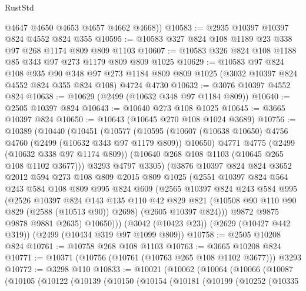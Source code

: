 \begin{lexlean}{RustStd}
\begin{coremodule}
        @4647
        @4650
        @4653
        @4657
        @4662
        @4668))
@10583 := @2935 @10397 @10397 @824 @4552 @824 @355
@10595 := @10583 @327 @824 @108 @1189 @23 @338 @97 @268 @1174 @809 @809 @1103
@10607 := @10583 @326 @824 @108 @1188 @85 @343 @97 @273 @1179 @809 @809 @1025
@10629 := @10583
    @97
    @824
    @108
    @935
    @90
    @348
    @97
    @273
    @1184
    @809
    @809
    @1025
    (@3032 @10397 @824 @4552 @824 @355 @824 @108)
    @4724
    @4730
@10632 := @3076 @10397 @4552 @824
@10638 := @10629 (@2499 (@10632 @348 @97 @1184 @809))
@10640 := @2505 @10397 @824
@10643 := @10640 @273 @108 @1025
@10645 := @3665 @10397 @824
@10650 := @10643 (@10645 @270 @108 @1024 @3689)
@10756 := @10389
    (@10440
      (@10451
        (@10577
          (@10595
            (@10607 (@10638 @10650) @4756 @4760 (@2499 (@10632 @343 @97 @1179 @809)) @10650)
            @4771
            @4775
            (@2499 (@10632 @338 @97 @1174 @809))
            (@10640 @268 @108 @1103 (@10645 @265 @108 @1102 @3677)))
          @3293
          @4797
          @3305)
        (@3876
          @10397
          @824
          @824
          @3652
          @2012
          @594
          @273
          @108
          @809
          @2015
          @809
          @1025
          (@2551
            @10397
            @824
            @564
            @243
            @584
            @108
            @809
            @995
            @824
            @609
            (@2565
              @10397
              @824
              @243
              @584
              @995
              (@2526
                @10397
                @824
                @143
                @135
                @110
                @42
                @829
                @821
                (@10508 @90 @110 @90 @829 (@2588 (@10513 @90)) @2698)
                (@2605 @10397 @824)))
            @9872
            @9875
            @9878
            @9881
            @2635)
          @10650)))
    (@3042 (@10423 @23))
    (@2629 (@10427 @442 @319))
    (@2499 (@10434 @319 @97 @1099 @809))
@10758 := @2505 @10208 @824
@10761 := @10758 @268 @108 @1103
@10763 := @3665 @10208 @824
@10771 := @10371 (@10756 (@10761 (@10763 @265 @108 @1102 @3677))) @3293
@10772 := @3298 @110
@10833 := @10021
    (@10062
      (@10064
        (@10066
          (@10087
            (@10105
              (@10122
                (@10139
                  (@10150
                    (@10154
                      (@10181
                        (@10199
                          (@10252
                            (@10335

\end{coremodule}
\end{lexlean}
